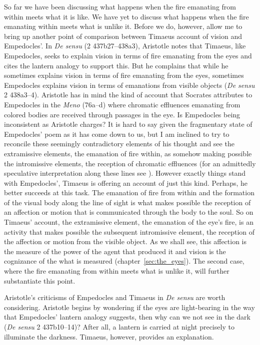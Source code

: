 So far we have been discussing what happens when the fire emanating from within meets what it is like. We have yet to discuss what happens when the fire emanating within meets what is unlike it. Before we do, however, allow me to bring up another point of comparison between Timaeus account of vision and Empedocles'. In \emph{De sensu} (2 437b27--438a3), Aristotle notes that Timaeus, like Empedocles, seeks to explain vision in terms of fire emanating from the eyes and cites the lantern analogy to support this. But he complains that while he sometimes explains vision in terms of fire emanating from the eyes, sometimes Empedocles explains vision in terms of emanations from visible objects (\emph{De sensu} 2 438a3--4). Aristotle has in mind the kind of account that Socrates attributes to Empedocles in the \emph{Meno} (76a--d) where chromatic effluences emanating from colored bodies are received through passages in the eye. Is Empedocles being inconsistent as Aristotle charges? It is hard to say given the fragmentary state of Empedocles' poem as it has come down to us, but I am inclined to try to reconcile these seemingly contradictory elements of his thought and see the extramissive elements, the emanation of fire within, as somehow making possible the intromissive elements, the reception of chromatic effluences (for an admittedly speculative interpretation along these lines see \citealt[chapter 1.3]{Kalderon:2015fr}). However exactly things stand with Empedocles', Timaeus is offering an account of just this kind. Perhaps, he better succeeds at this task. The emanation of fire from within and the formation of the visual body along the line of sight is what makes possible the reception of an affection or motion that is communicated through the body to the soul. So on Timaeus' account, the extramissive element, the emanation of the eye's fire, is an activity that makes possible the subsequent intromissive element, the reception of the affection or motion from the visible object. As we shall see, this affection is the measure of the power of the agent that produced it and vision is the cognizance of the what is measured (chapter~\ref{sec:the_eyes}). The second case, where the fire emanating from within meets what is unlike it, will further substantiate this point.

Aristotle's criticisms of Empedocles and Timaeus in \emph{De sensu} are worth considering. Aristotle begins by wondering if the eyes are light-bearing in the way that Empedocles' lantern analogy suggests, then why can we not see in the dark (\emph{De sensu} 2 437b10--14)? After all, a lantern is carried at night precisely to illuminate the darkness. Timaeus, however, provides an explanation.

